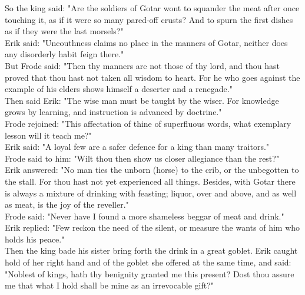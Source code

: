 \documentclass[10pt,a4paper]{report}
\begin{document}
So the king said: "Are the soldiers of Gotar wont to squander the meat after once touching it, as if it were so many pared-off crusts? And to spurn the first dishes as if they were the last morsels?"\\

Erik said: "Uncouthness claims no place in the manners of Gotar, neither does any disorderly habit feign there."\\

But Frode said: "Then thy manners are not those of thy lord, and thou hast proved that thou hast not taken all wisdom to heart. For he who goes against the example of his elders shows himself a deserter and a renegade."\\

Then said Erik: "The wise man must be taught by the wiser. For knowledge grows by learning, and instruction is advanced by doctrine."\\

Frode rejoined: "This affectation of thine of superfluous words, what exemplary lesson will it teach me?"\\

Erik said: "A loyal few are a safer defence for a king than many traitors."\\

Frode said to him: "Wilt thou then show us closer allegiance than the rest?"\\

Erik answered: "No man ties the unborn (horse) to the crib, or the unbegotten to the stall. For thou hast not yet experienced all things. Besides, with Gotar there is always a mixture of drinking with feasting; liquor, over and above, and as well as meat, is the joy of the reveller."\\

Frode said: "Never have I found a more shameless beggar of meat and drink."\\

Erik replied: "Few reckon the need of the silent, or measure the wants of him who holds his peace."\\

Then the king bade his sister bring forth the drink in a great goblet. Erik caught hold of her right hand and of the goblet she offered at the same time, and said: "Noblest of kings, hath thy benignity granted me this present? Dost thou assure me that what I hold shall be mine as an irrevocable gift?"\\
\end{document}
